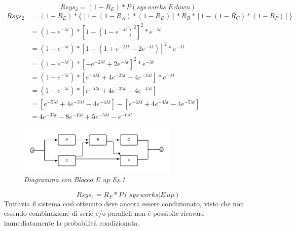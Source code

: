 \begin{equation*}
	Rsys_2 = (1-R_E)*P(sys\,works|E\,down)
\end{equation*}
\begin{equation*}
	\begin{split}
		Rsys_2 &= (1-R_E)*\{[1-(1-R_A)*(1-R_D)]*R_B*[1-(1-R_C)*(1-R_F)]\} \\
		&= (1-e^{-\lambda t})*[1-(1-e^{-\lambda t})^{2}]^{2}*e^{-\lambda t} \\
		&= (1-e^{-\lambda t})*[1-(1+e^{-2\lambda t}-2e^{-\lambda t})]^{2}*e^{-\lambda t} \\
		&= (1-e^{-\lambda t})*[-e^{-2\lambda t}+2e^{-\lambda t}]^{2}*e^{-\lambda t} \\
		&= (1-e^{-\lambda t})*[e^{-4\lambda t}+4e^{-2\lambda t}-4e^{-3\lambda t}]*e^{-\lambda t} \\
		&=(1-e^{-\lambda t})*[e^{-5\lambda t}+4e^{-3\lambda t}-4e^{-4\lambda t}] \\
		&= [e^{-5\lambda t}+4e^{-3\lambda t}-4e^{-4\lambda t}] - [e^{-6\lambda t}+4e^{-4\lambda t}-4e^{-5\lambda t}] \\
		&= 4e^{-3\lambda t}-8e^{-4\lambda t}+5e^{-5\lambda t}-e^{-6\lambda t}
	\end{split}
\end{equation*}
\begin{figure}[H]
	\centering
	\includegraphics[width=0.7\textwidth]{img/hw5/e_up.png}
	\caption{\textit{Diagramma con Blocco E up Es.1}}
\end{figure}
\begin{equation*}
	Rsys_1 = R_E*P(sys\,works|E\,up)
\end{equation*}
Tuttavia il sistema così ottenuto deve ancora essere condizionato, visto che non essendo combinazione di serie e/o paralleli non è possibile ricavare immediatamente la probabilità condizionata.
